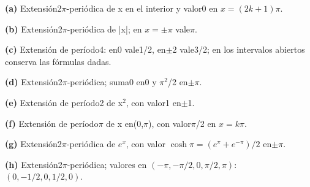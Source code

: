 \noindent\textbf{(a)} Extensión2\ensuremath{\pi}-periódica de x en el interior y valor0 en \(x=(2k+1)\pi\).

\noindent\textbf{(b)} Extensión2\ensuremath{\pi}-periódica de |x|; en \(x=\pm\pi\) vale\ensuremath{\pi}.

\noindent\textbf{(c)} Extensión de período4: en0 vale1/2, en\ensuremath{\pm}2 vale3/2; en los intervalos abiertos conserva las fórmulas dadas.

\noindent\textbf{(d)} Extensión2\ensuremath{\pi}-periódica; suma0 en0 y \ensuremath{\pi}\ensuremath{^{2}}/2 en\ensuremath{\pm}\ensuremath{\pi}.

\noindent\textbf{(e)} Extensión de período2 de x\ensuremath{^{2}}, con valor1 en\ensuremath{\pm}1.

\noindent\textbf{(f)} Extensión de período\ensuremath{\pi} de x en(0,\ensuremath{\pi}), con valor\ensuremath{\pi}/2 en \(x=k\pi\).

\noindent\textbf{(g)} Extensión2\ensuremath{\pi}-periódica de \(e^x\), con valor \(\cosh\pi=(e^\pi+e^{-\pi})/2\) en\ensuremath{\pm}\ensuremath{\pi}.

\noindent\textbf{(h)} Extensión2\ensuremath{\pi}-periódica; valores en \((-\pi,-\pi/2,0,\pi/2,\pi)\): \((0,-1/2,0,1/2,0)\).
